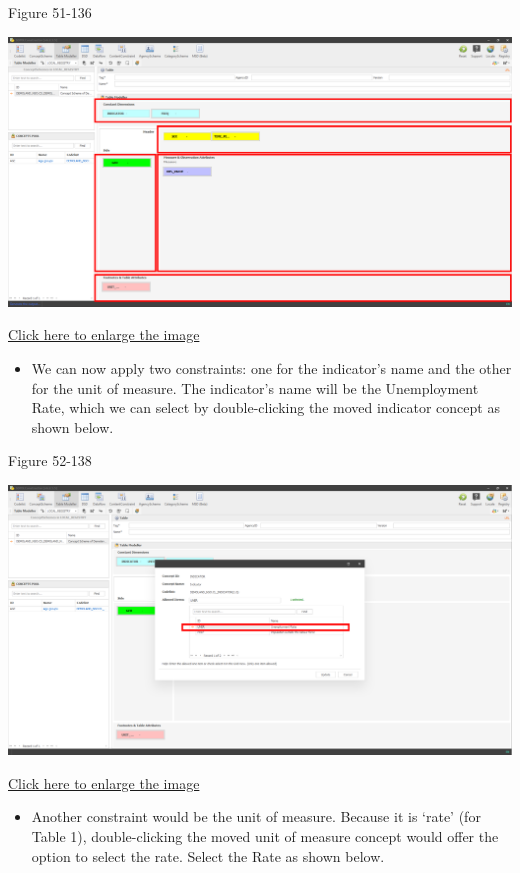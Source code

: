 \documentclass[
]{book}
\providecommand{\tightlist}{%
  \setlength{\itemsep}{0pt}\setlength{\parskip}{0pt}}
\theoremstyle{definition}
\theoremstyle{definition}
\theoremstyle{definition}
\theoremstyle{definition}
\theoremstyle{remark}
\begin{document}
Figure 51-136

\begin{center}\includegraphics[width=1\linewidth]{./images/image136} \end{center}

\href{images/image136.png}{Click here to enlarge the image}

\begin{itemize}
\tightlist
\item
  We can now apply two constraints: one for the indicator's name and the other for the unit of measure. The indicator's name will be the Unemployment Rate, which we can select by double-clicking the moved indicator concept as shown below.
\end{itemize}

Figure 52-138

\begin{center}\includegraphics[width=1\linewidth]{./images/image138} \end{center}

\href{images/image138.png}{Click here to enlarge the image}

\begin{itemize}
\tightlist
\item
  Another constraint would be the unit of measure. Because it is `rate' (for Table 1), double-clicking the moved unit of measure concept would offer the option to select the rate. Select the Rate as shown below.
\end{itemize}
\end{document}
